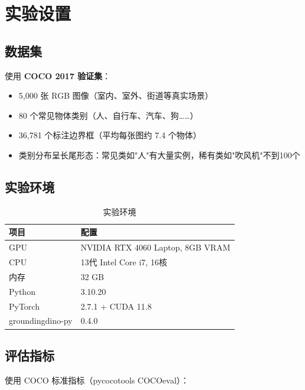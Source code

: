 \documentclass[12pt,a4paper]{ctexart}
\begin{document}
\section{实验设置}

\subsection{数据集}

使用 \textbf{COCO 2017 验证集}：
\begin{itemize}
    \item 5,000 张 RGB 图像（室内、室外、街道等真实场景）
    \item 80 个常见物体类别（人、自行车、汽车、狗……）
    \item 36,781 个标注边界框（平均每张图约 7.4 个物体）
    \item 类别分布呈长尾形态：常见类如"人"有大量实例，稀有类如"吹风机"不到100个
\end{itemize}

\subsection{实验环境}

\begin{table}[H]
    \centering
    \caption{实验环境}
    \small
    \begin{tabular}{ll}
        \toprule
        \textbf{项目} & \textbf{配置} \\
        \midrule
        GPU & NVIDIA RTX 4060 Laptop, 8GB VRAM \\
        CPU & 13代 Intel Core i7, 16核 \\
        内存 & 32 GB \\
        Python & 3.10.20 \\
        PyTorch & 2.7.1 + CUDA 11.8 \\
        groundingdino-py & 0.4.0 \\
        \bottomrule
    \end{tabular}
\end{table}

\subsection{评估指标}

使用 COCO 标准指标（pycocotools COCOeval）：
\end{document}
